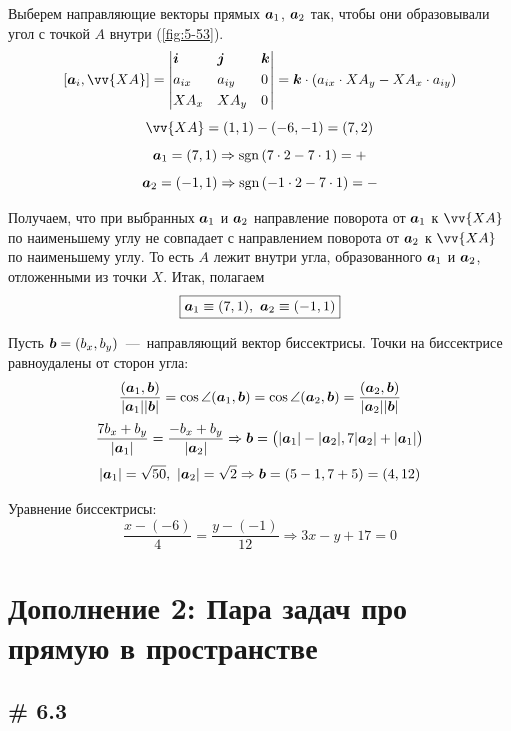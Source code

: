 \documentclass[a4paper,12pt]{article}
\begin{document}
\begin{solution}
    Выберем направляющие векторы прямых $\boldsymbol a_1$, $\boldsymbol a_2$ так, чтобы они образовывали угол с точкой $A$ внутри (\ref{fig:5-53}).
    \[
      [\bds a_i, \vv{XA}] = \left|
        \begin{aligned}
          &\bds i & &\bds j & &\bds k\\
          &a_{ix} & &a_{iy} & &0\\
          &XA_x & &XA_y & &0
        \end{aligned}
      \right|
      = \bds k \cdot (a_{ix} \cdot XA_y - XA_x \cdot a_{iy})
    \]
    \[
      \vv{XA} = (1, 1) - (-6, -1) = (7, 2)
    \]
    \[
      \boldsymbol a_1 = (7, 1) \Rightarrow \operatorname{sgn}{(7 \cdot 2 - 7 \cdot 1)} = +
    \]
    \[
      \boldsymbol a_2 = (-1, 1) \Rightarrow \operatorname{sgn}{(-1 \cdot 2 - 7 \cdot 1)} = -
    \]
    
    Получаем, что при выбранных $\boldsymbol a_1$ и $\boldsymbol a_2$ направление поворота от $\boldsymbol a_1$ к $\vv{XA}$ по наименьшему углу не совпадает с направлением поворота от $\boldsymbol a_2$ к $\vv{XA}$ по наименьшему углу.
    То есть $A$ лежит внутри угла, образованного $\boldsymbol a_1$ и $\boldsymbol a_2$, отложенными из точки $X$.
    Итак, полагаем
    \[
      \boxed{\boldsymbol a_1 \equiv (7, 1),\ \boldsymbol a_2 \equiv (-1, 1)}
    \]

    Пусть $\bds b \hm= (b_x, b_y)$~---~направляющий вектор биссектрисы. Точки на биссектрисе равноудалены от сторон угла:
    \[
      \frac{(\boldsymbol a_1, \boldsymbol b)}{|\boldsymbol a_1||\boldsymbol b|} = \cos \angle (\boldsymbol a_1, \boldsymbol b)
      = \cos \angle (\boldsymbol a_2, \boldsymbol b)
      = \frac{(\boldsymbol a_2, \boldsymbol b)}{|\boldsymbol a_2||\boldsymbol b|}
    \]
    \[
      \frac{7 b_x + b_y}{|\boldsymbol a_1|} = \frac{-b_x + b_y}{|\boldsymbol a_2|}
      \Rightarrow
      \boldsymbol b = \bigl(|\boldsymbol a_1| - |\boldsymbol a_2|, 7|\boldsymbol a_2| + |\boldsymbol a_1|\bigr)
    \]
    \[
      |\boldsymbol a_1| = \sqrt{50},\ |\boldsymbol a_2| = \sqrt{2} \Rightarrow \boldsymbol b = (5 - 1, 7 + 5) = (4, 12)
    \]

    Уравнение биссектрисы:
    \[
      \frac{x - (-6)}{4} = \frac{y - (-1)}{12}
      \Rightarrow \boxed{3x - y + 17 = 0}
    \]
  \end{solution}
  
  
  \section{Дополнение 2: Пара задач про прямую в пространстве}
  
  \subsection{\# 6.3}
  
\end{document}
